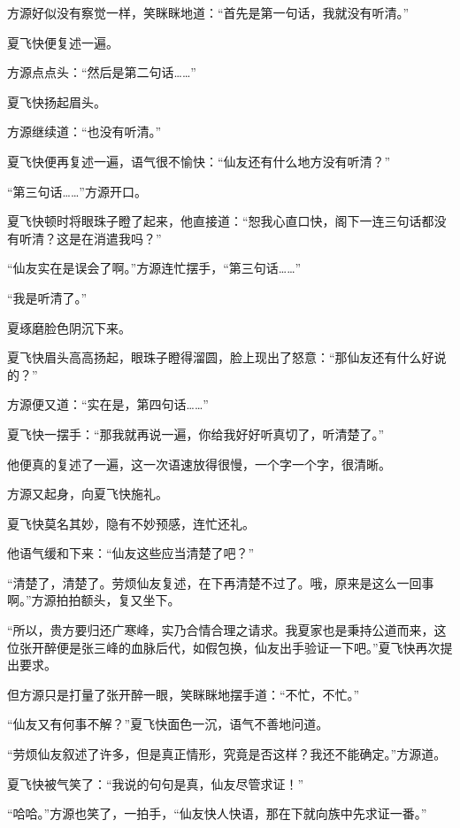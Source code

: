 
\begin{this_body}



方源好似没有察觉一样，笑眯眯地道：“首先是第一句话，我就没有听清。”

夏飞快便复述一遍。

方源点点头：“然后是第二句话……”

夏飞快扬起眉头。

方源继续道：“也没有听清。”

夏飞快便再复述一遍，语气很不愉快：“仙友还有什么地方没有听清？”

“第三句话……”方源开口。

夏飞快顿时将眼珠子瞪了起来，他直接道：“恕我心直口快，阁下一连三句话都没有听清？这是在消遣我吗？”

“仙友实在是误会了啊。”方源连忙摆手，“第三句话……”

“我是听清了。”

夏琢磨脸色阴沉下来。

夏飞快眉头高高扬起，眼珠子瞪得溜圆，脸上现出了怒意：“那仙友还有什么好说的？”

方源便又道：“实在是，第四句话……”

夏飞快一摆手：“那我就再说一遍，你给我好好听真切了，听清楚了。”

他便真的复述了一遍，这一次语速放得很慢，一个字一个字，很清晰。

方源又起身，向夏飞快施礼。

夏飞快莫名其妙，隐有不妙预感，连忙还礼。

他语气缓和下来：“仙友这些应当清楚了吧？”

“清楚了，清楚了。劳烦仙友复述，在下再清楚不过了。哦，原来是这么一回事啊。”方源拍拍额头，复又坐下。

“所以，贵方要归还广寒峰，实乃合情合理之请求。我夏家也是秉持公道而来，这位张开醉便是张三峰的血脉后代，如假包换，仙友出手验证一下吧。”夏飞快再次提出要求。

但方源只是打量了张开醉一眼，笑眯眯地摆手道：“不忙，不忙。”

“仙友又有何事不解？”夏飞快面色一沉，语气不善地问道。

“劳烦仙友叙述了许多，但是真正情形，究竟是否这样？我还不能确定。”方源道。

夏飞快被气笑了：“我说的句句是真，仙友尽管求证！”

“哈哈。”方源也笑了，一拍手，“仙友快人快语，那在下就向族中先求证一番。”


\end{this_body}
